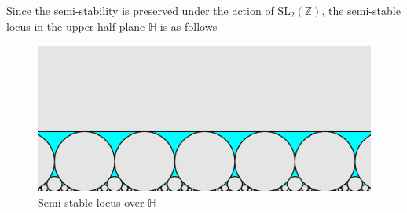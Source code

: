 \documentclass[pdf]{beamer}
\begin{document}
\begin{frame}
    Since the semi-stability is preserved under the action of $\text{SL}_2(\mathbb{Z})$, the semi-stable locus in the
    upper half plane $\mathbb{H}$ is as follows

\end{frame}
\begin{frame}
    \begin{figure}[h]
        \includegraphics[width = \textwidth]{ss-locus.png}
        \caption{Semi-stable locus over $\mathbb{H}$}
    \end{figure}
\end{frame}
\end{document}
